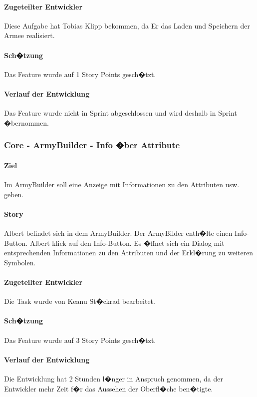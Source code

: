 \documentclass[12pt, titlepage]{scrartcl}
\newcommand{\RN}[1]{%
	\textup{\uppercase\expandafter{\romannumeral#1}}%
}
\begin{document}
		\paragraph{Zugeteilter Entwickler} Diese Aufgabe hat Tobias Klipp bekommen, da Er das Laden und Speichern der Armee realisiert.
		\paragraph{Sch�tzung}
		Das Feature wurde auf 1 Story Points gesch�tzt.
		\paragraph{Verlauf der Entwicklung} 
		Das Feature wurde nicht in Sprint \RN{3} abgeschlossen und wird deshalb in Sprint \RN{4} �bernommen.
		
		\subsubsection{Core - ArmyBuilder - Info �ber Attribute}
		\paragraph{Ziel} Im ArmyBuilder soll eine Anzeige mit Informationen zu den Attributen usw. geben.
		\paragraph{Story}Albert befindet sich in dem ArmyBuilder. Der ArmyBilder enth�lte einen \glqq Info\grqq-Button. Albert klick auf den \glqq Info\grqq-Button. Es �ffnet sich ein Dialog mit entsprechenden Informationen zu den Attributen und der Erkl�rung zu weiteren Symbolen.
		\paragraph{Zugeteilter Entwickler} Die Task wurde von Keanu St�ckrad bearbeitet.
		\paragraph{Sch�tzung}
		Das Feature wurde auf 3 Story Points gesch�tzt.
		\paragraph{Verlauf der Entwicklung} 
		Die Entwicklung hat 2 Stunden l�nger in Anspruch genommen, da der Entwickler mehr Zeit f�r das Aussehen der Oberfl�che ben�tigte.
		
\end{document}
